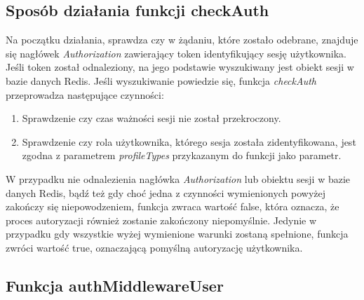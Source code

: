 \documentclass[a4paper,12pt,twoside,openany]{report}
\begin{document}
\subsection{Sposób działania funkcji checkAuth}
Na początku działania, sprawdza czy w żądaniu, które zostało odebrane, znajduje się nagłówek \textit{Authorization} zawierający token identyfikujący sesję użytkownika. Jeśli token został odnaleziony, na jego podstawie wyszukiwany jest obiekt sesji w bazie danych Redis. Jeśli wyszukiwanie powiedzie się, funkcja \textit{checkAuth} przeprowadza następujące czynności:
\begin{enumerate}	
	\item Sprawdzenie czy czas ważności sesji nie został przekroczony.
	
	\item Sprawdzenie czy rola użytkownika, którego sesja została zidentyfikowana, jest zgodna z parametrem \textit{profileTypes} przykazanym do funkcji jako parametr.
\end{enumerate}
W przypadku nie odnalezienia nagłówka \textit{Authorization} lub obiektu sesji w bazie danych Redis, bądź też gdy choć jedna z czynności wymienionych powyżej zakończy się niepowodzeniem, funkcja zwraca wartość false, która oznacza, że proces autoryzacji również zostanie zakończony niepomyślnie. Jedynie w przypadku gdy wszystkie wyżej wymienione warunki zostaną spełnione, funkcja zwróci wartość true, oznaczającą pomyślną autoryzację użytkownika.

\subsection{Funkcja authMiddlewareUser}


 
\begin{thebibliography}{99}


\end{thebibliography}

\zakonczenie  %
\end{document}
